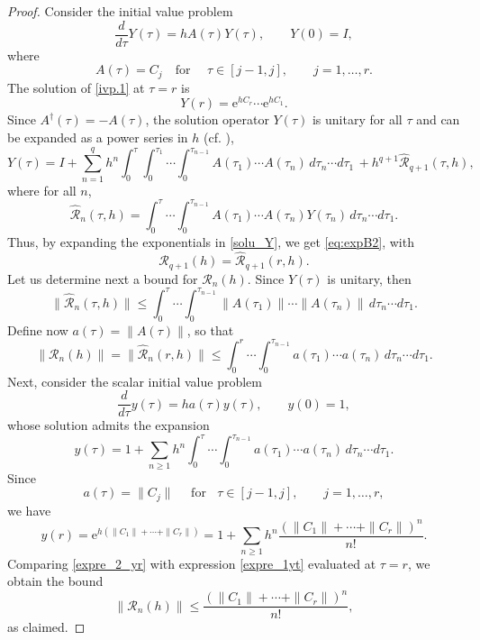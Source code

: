 \documentclass[11pt]{article}
\newcommand{\e}{\ensuremath{\mathrm{e}}}
\begin{document}
\begin{proof}
Consider the initial value problem
\begin{equation}
\label{ivp.1}
\frac{d}{d\tau} Y(\tau) = h A(\tau) Y(\tau), \qquad Y(0) = I,
\end{equation}
where
\[
A(\tau) = C_j \quad \text{for } \quad \tau \in [j-1, j], \qquad j=1,\ldots,r.
\]
The solution of \eqref{ivp.1} at $\tau = r$ is
\begin{equation} \label{solu_Y}
Y(r) = \mathrm{e}^{h C_r} \cdots \mathrm{e}^{h C_1}.
\end{equation}
Since $A^\dagger(\tau) = -A(\tau)$, the solution operator $Y(\tau)$ is unitary for all $\tau$ and can be expanded as a power series in $h$ (cf. \cite{blanes24smf}),
\[
Y(\tau) = I + \sum_{n=1}^{q} h^n \int_0^{\tau} \int_0^{\tau_1} \cdots \int_0^{\tau_{n-1}} A(\tau_1) \cdots A(\tau_n) \, d\tau_n \cdots d\tau_1 
 \, + h^{q+1} \hat{\mathcal{R}}_{q+1}(\tau, h),
\]
where for all $n$,
\[
\hat{\mathcal{R}}_n(\tau, h) = \int_0^{\tau} \cdots \int_0^{\tau_{n-1}} A(\tau_1) \cdots A(\tau_n) Y(\tau_n) \, d\tau_n \cdots d\tau_1.
\]
Thus, by expanding the exponentials in \eqref{solu_Y}, we get \eqref{eq:expB2}, with
\[
\mathcal{R}_{q+1}(h) = \hat{\mathcal{R}}_{q+1}(r, h).
\]
Let us determine next a bound for $\mathcal{R}_n(h)$.  Since $Y(\tau)$ is unitary, then
\[
\|\hat{\mathcal{R}}_n(\tau,h)\| \leq \int_0^{\tau} \cdots \int_0^{\tau_{n-1}} \|A(\tau_1)\| \cdots \|A(\tau_n)\| \, d\tau_n \cdots d\tau_1.
\]
Define now $a(\tau) = \|A(\tau)\|$, so that
\[
 \|\mathcal{R}_n(h)\|  = \|\hat{\mathcal{R}}_n(r, h)\| \leq \int_0^r \cdots \int_0^{\tau_{n-1}} a(\tau_1) \cdots a(\tau_n) \, d\tau_n \cdots d\tau_1.
\]
Next, consider the scalar initial value problem
\[
\frac{d}{d\tau} y(\tau) = h a(\tau) y(\tau), \qquad y(0) = 1,
\]
whose solution admits the expansion
\begin{equation} \label{expre_1yt}
y(\tau) = 1 + \sum_{n \geq 1} h^n \int_0^\tau \cdots \int_0^{\tau_{n-1}} a(\tau_1) \cdots a(\tau_n) \, d\tau_n \cdots d\tau_1.
\end{equation}
Since
\[
a(\tau) =\|C_j\| \quad \text{ for } \;\; \tau \in [j-1, j], \qquad j = 1, \ldots, r,
\]
we have
\begin{equation} \label{expre_2_yr}
y(r) = \e^{h( \|C_1\|  + \cdots + \|C_r\| )} = 1 + \sum_{n \geq 1} h^n \frac{(\|C_1\| + \cdots + \|C_r\| )^n}{n!}.
\end{equation}
Comparing \eqref{expre_2_yr} with expression \eqref{expre_1yt} evaluated at $\tau = r$, we obtain the bound
\[
\|\mathcal{R}_n(h)\| \leq \frac{(\|C_1\| + \cdots + \|C_r\| )^n}{n!},
\]
as claimed.
\end{proof}
\end{document}
